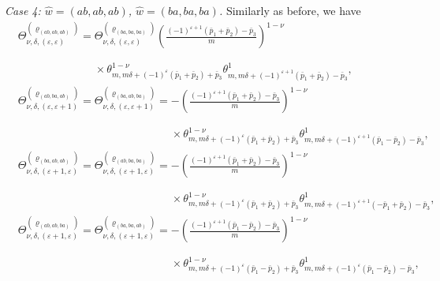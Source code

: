 \documentclass[pdftex]{sigma}
\def\bos{\varrho}
\theoremstyle{definition}
\numberwithin{equation}{section}
\begin{document}
{\em Case 4: $\hat w=(ab,ab,ab)$, $\hat w=(ba,ba,ba)$.}
Similarly as before, we have
\begin{align*}%
& \Theta_{\nu,\delta,(\varepsilon,\varepsilon)}^{(\bos_{(ab,ab,ab)})}= \Theta_{\nu,\delta,(\varepsilon,\varepsilon)}^{(\bos_{(ba,ba,ba)})} \left(\frac{(-1)^{\varepsilon+1}({\bar p_1}+{\bar p_2})-{\bar p_3}}{m}\right)^{1-\nu}\\
&\phantom{ \Theta_{\nu,\delta,(\varepsilon,\varepsilon)}^{(\bos_{(ab,ab,ab)})}= }{}\times
 \theta^{1-\nu}_{m,m\delta+(-1)^{\varepsilon}(\bar p_1+\bar p_2)+\bar p_3} \theta^1_{m,m\delta+ (-1)^{\varepsilon+1} (\bar p_1+\bar p_2) -\bar p_3},
\\
&\Theta_{\nu,\delta,(\varepsilon,\varepsilon+1)}^{(\bos_{(ab,ba,ab)})}=\Theta_{\nu,\delta,(\varepsilon,\varepsilon+1)}^{(\bos_{(ba,ab,ba)})}=
- \left(\frac{(-1)^{\varepsilon+1}({\bar p_1}+{\bar p_2})-{\bar p_3}}{m}\right)^{1-\nu}\\
&\phantom{\Theta_{\nu,\delta,(\varepsilon,\varepsilon+1)}^{(\bos_{(ab,ba,ab)})}=\Theta_{\nu,\delta,(\varepsilon,\varepsilon+1)}^{(\bos_{(ba,ab,ba)})}=}{}\times
 \theta^{1-\nu}_{m,m\delta+(-1)^{\varepsilon}(\bar p_1+\bar p_2)+\bar p_3} \theta^1_{m,m\delta+ (-1)^{\varepsilon+1} (\bar p_1-\bar p_2) -\bar p_3},
\\
&\Theta_{\nu,\delta,(\varepsilon+1,\varepsilon)}^{(\bos_{(ba,ab,ab)})}=\Theta_{\nu,\delta,(\varepsilon+1,\varepsilon)}^{(\bos_{(ab,ba,ba)})}=
- \left(\frac{(-1)^{\varepsilon+1}({\bar p_1}+{\bar p_2})-{\bar p_3}}{m}\right)^{1-\nu}\\
&\phantom{\Theta_{\nu,\delta,(\varepsilon+1,\varepsilon)}^{(\bos_{(ba,ab,ab)})}=\Theta_{\nu,\delta,(\varepsilon+1,\varepsilon)}^{(\bos_{(ab,ba,ba)})}=}{}\times
 \theta^{1-\nu}_{m,m\delta+(-1)^{\varepsilon}(\bar p_1+\bar p_2)+\bar p_3} \theta^1_{m,m\delta+ (-1)^{\varepsilon+1} (-\bar p_1+\bar p_2) -\bar p_3},
\\
&\Theta_{\nu,\delta,(\varepsilon+1,\varepsilon)}^{(\bos_{(ab,ab,ba)})}=\Theta_{\nu,\delta,(\varepsilon+1,\varepsilon)}^{(\bos_{(ba,ba,ab)})}=
- \left(\frac{(-1)^{\varepsilon+1}({\bar p_1}-{\bar p_2})-{\bar p_3}}{m}\right)^{1-\nu}\\
&\phantom{\Theta_{\nu,\delta,(\varepsilon+1,\varepsilon)}^{(\bos_{(ab,ab,ba)})}=\Theta_{\nu,\delta,(\varepsilon+1,\varepsilon)}^{(\bos_{(ba,ba,ab)})}=}{}\times
\theta^{1-\nu}_{m,m\delta+ (-1)^{\varepsilon}({\bar p_1}-{\bar p_2})+{\bar p_3}} \theta^1_{m,m\delta+ (-1)^{\varepsilon} (\bar p_1-\bar p_2) -\bar p_3},\\

\end{align*}
\end{document}
